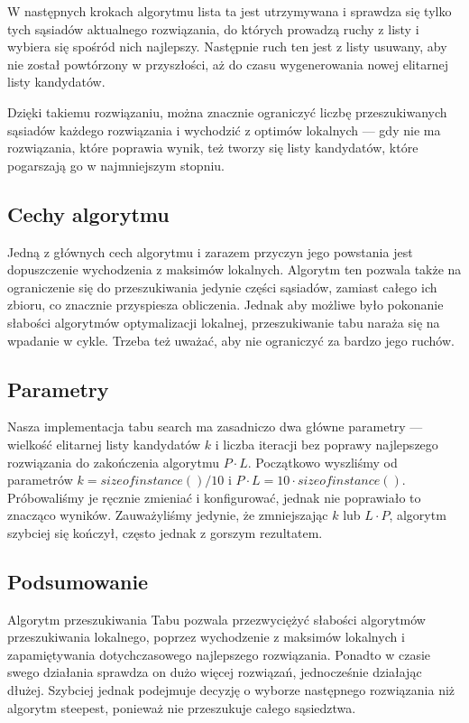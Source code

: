 W następnych krokach algorytmu lista ta jest utrzymywana i sprawdza się tylko tych sąsiadów aktualnego rozwiązania, do których prowadzą ruchy z listy i wybiera się spośród nich najlepszy. Następnie ruch ten jest z listy usuwany, aby nie został powtórzony w przyszłości, aż do czasu wygenerowania nowej elitarnej listy kandydatów.

Dzięki takiemu rozwiązaniu, można znacznie ograniczyć liczbę przeszukiwanych sąsiadów każdego rozwiązania i wychodzić z optimów lokalnych --- gdy nie ma rozwiązania, które poprawia wynik, też tworzy się listy kandydatów, które pogarszają go w najmniejszym stopniu.

\subsection{Cechy algorytmu}

Jedną z głównych cech algorytmu i zarazem przyczyn jego powstania jest dopuszczenie wychodzenia z maksimów lokalnych. Algorytm ten pozwala także na ograniczenie się do przeszukiwania jedynie części sąsiadów, zamiast całego ich zbioru, co znacznie przyspiesza obliczenia. Jednak aby możliwe było pokonanie słabości algorytmów optymalizacji lokalnej, przeszukiwanie tabu naraża się na wpadanie w cykle. Trzeba też uważać, aby nie ograniczyć za bardzo jego ruchów.

\subsection{Parametry}

Nasza implementacja tabu search ma zasadniczo dwa główne parametry --- wielkość elitarnej listy kandydatów $k$ i liczba iteracji bez poprawy najlepszego rozwiązania do zakończenia algorytmu $P \cdot L$.
Początkowo wyszliśmy od parametrów $k = sizeofinstance() / 10$ i $P \cdot L = 10 \cdot sizeofinstance()$. Próbowaliśmy je ręcznie zmieniać i konfigurować, jednak nie poprawiało to znacząco wyników. Zauważyliśmy jedynie, że zmniejszając $k$ lub $L \cdot P$, algorytm szybciej się kończył, często jednak z gorszym rezultatem.

\subsection{Podsumowanie}

Algorytm przeszukiwania Tabu pozwala przezwyciężyć słabości algorytmów przeszukiwania lokalnego, poprzez wychodzenie z maksimów lokalnych i zapamiętywania dotychczasowego najlepszego rozwiązania. Ponadto w czasie swego działania sprawdza on dużo więcej rozwiązań, jednocześnie działając dłużej. Szybciej jednak podejmuje decyzję o wyborze następnego rozwiązania niż algorytm steepest, ponieważ nie przeszukuje całego sąsiedztwa.